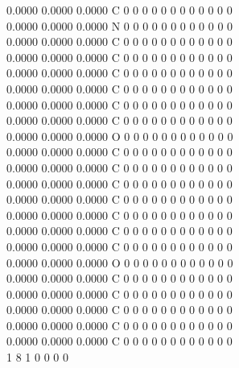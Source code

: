 \documentclass[11pt,titlepage,dvipdfmx,twoside]{jarticle}
\begin{document}
\begin{oframed}
{    0.0000    0.0000    0.0000  C  0  0  0  0  0  0  0  0  0  0  0  0   \\
    0.0000    0.0000    0.0000  N  0  0  0  0  0  0  0  0  0  0  0  0   \\
    0.0000    0.0000    0.0000  C  0  0  0  0  0  0  0  0  0  0  0  0   \\
    0.0000    0.0000    0.0000  C  0  0  0  0  0  0  0  0  0  0  0  0   \\
    0.0000    0.0000    0.0000  C  0  0  0  0  0  0  0  0  0  0  0  0   \\
    0.0000    0.0000    0.0000  C  0  0  0  0  0  0  0  0  0  0  0  0   \\
    0.0000    0.0000    0.0000  C  0  0  0  0  0  0  0  0  0  0  0  0   \\
    0.0000    0.0000    0.0000  C  0  0  0  0  0  0  0  0  0  0  0  0   \\
    0.0000    0.0000    0.0000  O  0  0  0  0  0  0  0  0  0  0  0  0   \\
    0.0000    0.0000    0.0000  C  0  0  0  0  0  0  0  0  0  0  0  0   \\
    0.0000    0.0000    0.0000  C  0  0  0  0  0  0  0  0  0  0  0  0   \\
    0.0000    0.0000    0.0000  C  0  0  0  0  0  0  0  0  0  0  0  0   \\
    0.0000    0.0000    0.0000  C  0  0  0  0  0  0  0  0  0  0  0  0   \\
    0.0000    0.0000    0.0000  C  0  0  0  0  0  0  0  0  0  0  0  0   \\
    0.0000    0.0000    0.0000  C  0  0  0  0  0  0  0  0  0  0  0  0   \\
    0.0000    0.0000    0.0000  C  0  0  0  0  0  0  0  0  0  0  0  0   \\
    0.0000    0.0000    0.0000  O  0  0  0  0  0  0  0  0  0  0  0  0   \\
    0.0000    0.0000    0.0000  C  0  0  0  0  0  0  0  0  0  0  0  0   \\
    0.0000    0.0000    0.0000  C  0  0  0  0  0  0  0  0  0  0  0  0   \\
    0.0000    0.0000    0.0000  C  0  0  0  0  0  0  0  0  0  0  0  0   \\
    0.0000    0.0000    0.0000  C  0  0  0  0  0  0  0  0  0  0  0  0   \\
    0.0000    0.0000    0.0000  C  0  0  0  0  0  0  0  0  0  0  0  0   \\
  1  8  1  0  0  0  0                                                   \\
}
\end{oframed}
\end{document}
